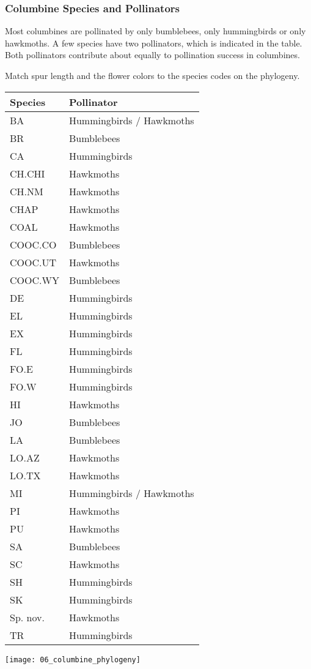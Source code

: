 \documentclass[12pt, hidelinks]{exam}
\begin{document}
\newpage

\subsubsection*{Columbine Species and Pollinators}

Most columbines are pollinated by only bumblebees, only hummingbirds or
only hawkmoths. A few species have two pollinators, which is indicated
in the table. Both pollinators contribute about equally to pollination
success in columbines.

Match spur length and the flower colors to the species codes on the phylogeny.

\begin{tabular}[c]{@{}ll@{}}
\toprule
Species & Pollinator\tabularnewline
\midrule
BA 				& Hummingbirds / Hawkmoths\tabularnewline
BR 				& Bumblebees\tabularnewline
CA 				& Hummingbirds\tabularnewline
CH.CHI 		& Hawkmoths\tabularnewline
CH.NM 		& Hawkmoths\tabularnewline
CHAP 			& Hawkmoths\tabularnewline
COAL 			& Hawkmoths\tabularnewline
COOC.CO	& Bumblebees\tabularnewline
COOC.UT 	& Hawkmoths\tabularnewline
COOC.WY 	& Bumblebees\tabularnewline
DE 				& Hummingbirds\tabularnewline
EL 				& Hummingbirds\tabularnewline
EX 				& Hummingbirds\tabularnewline
FL 				& Hummingbirds\tabularnewline
FO.E 			& Hummingbirds\tabularnewline
FO.W 			& Hummingbirds\tabularnewline
HI 				& Hawkmoths\tabularnewline
JO 				& Bumblebees\tabularnewline
LA 				& Bumblebees\tabularnewline
LO.AZ 			& Hawkmoths\tabularnewline
LO.TX 			& Hawkmoths\tabularnewline
MI 				& Hummingbirds / Hawkmoths\tabularnewline
PI 				& Hawkmoths\tabularnewline
PU 				& Hawkmoths\tabularnewline
SA 				& Bumblebees\tabularnewline
SC 				& Hawkmoths\tabularnewline
SH 				& Hummingbirds\tabularnewline
SK 				& Hummingbirds\tabularnewline
Sp. nov.		& Hawkmoths\tabularnewline
TR 				& Hummingbirds\tabularnewline
\bottomrule
\end{tabular}

\newpage

	\texttt{[image: 06\_columbine\_phylogeny]}
\end{document}
